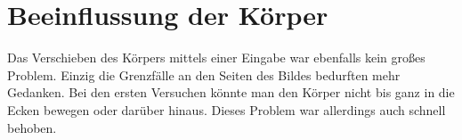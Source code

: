 \documentclass[parskip=full]{scrartcl}
\begin{document}
	\section{Beeinflussung der Körper}
		Das Verschieben des Körpers mittels einer Eingabe war ebenfalls kein großes Problem. Einzig die Grenzfälle an den Seiten des Bildes bedurften mehr Gedanken. Bei den ersten Versuchen könnte man den Körper nicht bis ganz in die Ecken bewegen oder darüber hinaus. Dieses Problem war allerdings auch schnell behoben.
	
\end{document}

